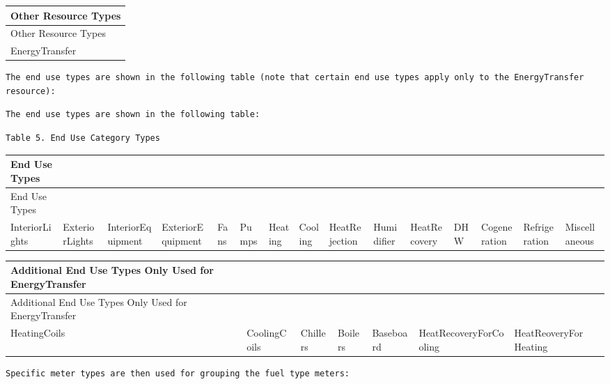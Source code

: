 \begin{longtable}[c]{@{}l@{}}
\toprule 
Other Resource Types \tabularnewline
\midrule
\endfirsthead

\toprule 
Other Resource Types \tabularnewline
\midrule
\endhead

EnergyTransfer \tabularnewline
\bottomrule
\end{longtable}

\begin{lstlisting}
The end use types are shown in the following table (note that certain end use types apply only to the EnergyTransfer resource):
\end{lstlisting}

\begin{lstlisting}
The end use types are shown in the following table:
\end{lstlisting}

\begin{lstlisting}
Table 5. End Use Category Types
\end{lstlisting}

\begin{longtable}[c]{p{0.4in}p{0.4in}p{0.4in}p{0.4in}p{0.4in}p{0.4in}p{0.4in}p{0.4in}p{0.4in}p{0.4in}p{0.4in}p{0.4in}p{0.4in}p{0.4in}p{0.4in}}
\toprule 
End Use Types \tabularnewline
\midrule
\endfirsthead

\toprule 
End Use Types \tabularnewline
\midrule
\endhead

InteriorLights & ExteriorLights & InteriorEquipment & ExteriorEquipment & Fans & Pumps & Heating & Cooling & HeatRejection & Humidifier & HeatRecovery & DHW & Cogeneration & Refrigeration & Miscellaneous \tabularnewline
\bottomrule
\end{longtable}

\begin{longtable}[c]{p{0.85in}p{0.85in}p{0.85in}p{0.85in}p{0.85in}p{0.85in}p{0.85in}}
\toprule 
Additional End Use Types Only Used for EnergyTransfer \tabularnewline
\midrule
\endfirsthead

\toprule 
Additional End Use Types Only Used for EnergyTransfer \tabularnewline
\midrule
\endhead

HeatingCoils & CoolingCoils & Chillers & Boilers & Baseboard & HeatRecoveryForCooling & HeatReoveryFor Heating \tabularnewline
\bottomrule
\end{longtable}

\begin{lstlisting}
Specific meter types are then used for grouping the fuel type meters:
\end{lstlisting}

